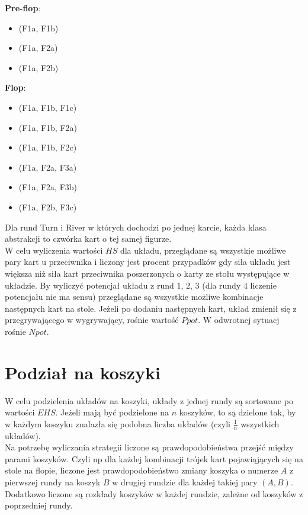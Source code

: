 \documentclass[licencjacka]{pracamgr}
\begin{document}
\noindent
\textbf{Pre-flop}:
\begin{itemize}
\item (F1a, F1b)
\item (F1a, F2a)
\item (F1a, F2b)
\end{itemize}

\noindent
\textbf{Flop}:
\begin{itemize}
\item (F1a, F1b, F1c)
\item (F1a, F1b, F2a)
\item (F1a, F1b, F2c)
\item (F1a, F2a, F3a)
\item (F1a, F2a, F3b)
\item (F1a, F2b, F3c)
\end{itemize}

\noindent
Dla rund Turn i River w których dochodzi po jednej karcie, każda klasa abstrakcji to czwórka kart o tej samej figurze. \\

\noindent
W celu wyliczenia wartości $HS$ dla układu, przeglądane są wszystkie możliwe pary kart u przeciwnika i liczony jest procent
przypadków gdy siła układu jest większa niż siła kart przeciwnika poszerzonych o karty ze stołu występujące w układzie.
By wyliczyć potencjał układu z rund $1$, $2$, $3$ (dla rundy $4$ liczenie potencjału nie ma sensu) przeglądane są wszystkie
możliwe kombinacje następnych kart na stole. Jeżeli po dodaniu następnych kart, układ zmienił się z przegrywającego w
wygrywający, rośnie wartość $Ppot$. W odwrotnej sytuacj rośnie $Npot$.

\section{Podział na koszyki}

W celu podzielenia układów na koszyki, układy z jednej rundy są sortowane po wartości $EHS$. Jeżeli mają być podzielone na
$n$ koszyków, to są dzielone tak, by w każdym koszyku znalazła się podobna liczba układów (czyli $\frac{1}{n}$ wszystkich układów). \\
\noindent
Na potrzebę wyliczania strategii liczone są prawdopodobieństwa przejść między parami koszyków. Czyli np dla każdej kombinacji
trójek kart pojawiąjących się na stole na flopie, liczone jest prawdopodobieństwo zmiany koszyka o numerze $A$ z pierwszej
rundy na koszyk $B$ w drugiej rundzie dla każdej takiej pary $(A, B)$. Dodatkowo liczone są rozkłady koszyków
w każdej rundzie, zależne od koszyków z poprzedniej rundy.
\end{document}
